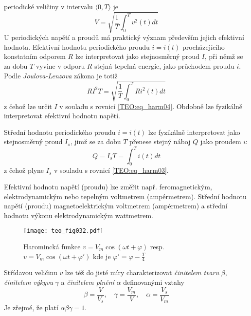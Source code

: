      periodické veličiny v intervalu $\langle 0, T\rangle$ je 
    \begin{equation}\label{TEO:eq_harm04}
      V = \sqrt{\frac{1}{T}\int_{0}^{T}v^2(t)dt}
    \end{equation}   
    U periodických napětí a proudů má praktický význam především jejich efektivní hodnota.
    Efektivní hodnotu periodického proudu $i=i(t)$ procházejícího konstatním odporem $R$ lze
    interpretovat jako stejnosměrný proud $I$, při němž se za dobu $T$ vyvine v odporu $R$ stejná
    tepelná energie, jako průchodem proudu $i$. Podle \emph{Joulova-Lenzova} zákona je totiž
    \begin{equation}\label{TEO:eq_harm05}
      RI^2T = \sqrt{\frac{1}{T}\int_{0}^{T}Ri^2(t)dt}
    \end{equation}       
    z čehož lze určit $I$ v souladu s rovnicí \ref{TEO:eq_harm04}. Obdobně lze fyzikálně
    interpretovat efektivní hodnotu napětí.
    
    Střední hodnotu periodického proudu $i=i(t)$ lze fyzikálně interpretovat jako stejnosměrný
    proud $I_s$, jimž se za dobu $T$ přenese stejný náboj $Q$ jako proudem $i$:
    \begin{equation}\label{TEO:eq_harm06}
      Q = I_sT = \int_{0}^{T}i(t)dt
    \end{equation}       
    z čehož plyne $I_s$ v souladu s rovnicí \ref{TEO:eq_harm03}.  
    
    Efektivní hodnotu napětí (proudu) lze změřit např. feromagnetickým, elektrodynamickým nebo
    tepelným voltmetrem (ampérmetrem). Střední hodnotu napětí (proudu) magnetoelektrickým
    voltmetrem (ampérmetrem) a střední hodnotu výkonu elektrodynamickým wattmetrem.

    \begin{figure}[ht!] %
       \centering
       \texttt{[image: teo\_fig032.pdf]}
       \caption{Haromincká funkce $v = V_m\cos(\omega t + \varphi)$ resp. 
                $v= V_m\cos(\omega t + \varphi')$ kde je $\varphi' = \varphi - \frac{T}{4}$}
       \label{teo:fig032}
    \end{figure}

    Střídavou veličinu $v$ lze též do jisté míry charakterizovat \emph{činitelem tvaru} $\beta$,
    \emph{činitelem výkyvu} $\gamma$ a \emph{činitelem plnění} $\alpha$ definovanými vztahy
    \begin{equation}\label{TEO:eq_harm07}
      \beta = \frac{V}{V_s}, \quad \gamma = \frac{V_m}{V}, \quad \alpha = \frac{V_s}{V_m}
    \end{equation}    
    Je zřejmé, že platí $\alpha\beta\gamma = 1$.
    

